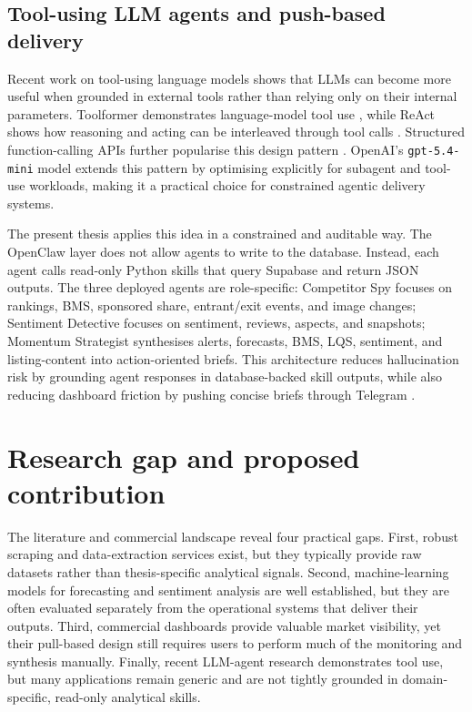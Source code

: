 \subsection{Tool-using LLM agents and push-based delivery}

Recent work on tool-using language models shows that LLMs can become
more useful when grounded in external tools rather than relying only on
their internal parameters. Toolformer demonstrates language-model tool
use \citep{schick2023toolformer}, while ReAct shows how reasoning and
acting can be interleaved through tool calls \citep{yao2022react}.
Structured function-calling APIs further popularise this design pattern
\citep{openai2023functions}. OpenAI's \texttt{gpt-5.4-mini} model
\citep{openai2026gpt54mini} extends this pattern by optimising
explicitly for subagent and tool-use workloads, making it a practical
choice for constrained agentic delivery systems.

The present thesis applies this idea in a constrained and auditable way.
The OpenClaw layer does not allow agents to write to the database.
Instead, each agent calls read-only Python skills that query Supabase and
return JSON outputs. The three deployed agents are role-specific:
Competitor Spy focuses on rankings, BMS, sponsored share, entrant/exit
events, and image changes; Sentiment Detective focuses on sentiment,
reviews, aspects, and snapshots; Momentum Strategist synthesises alerts,
forecasts, BMS, LQS, sentiment, and listing-content into action-oriented briefs. This
architecture reduces hallucination risk by grounding agent responses in
database-backed skill outputs, while also reducing dashboard friction by
pushing concise briefs through Telegram \citep{telegram2024bot}.

\section{Research gap and proposed contribution}

The literature and commercial landscape reveal four practical gaps.
First, robust scraping and data-extraction services exist, but they
typically provide raw datasets rather than thesis-specific analytical
signals. Second, machine-learning models for forecasting and sentiment
analysis are well established, but they are often evaluated separately
from the operational systems that deliver their outputs. Third,
commercial dashboards provide valuable market visibility, yet their
pull-based design still requires users to perform much of the monitoring
and synthesis manually. Finally, recent LLM-agent research demonstrates
tool use, but many applications remain generic and are not tightly
grounded in domain-specific, read-only analytical skills.


